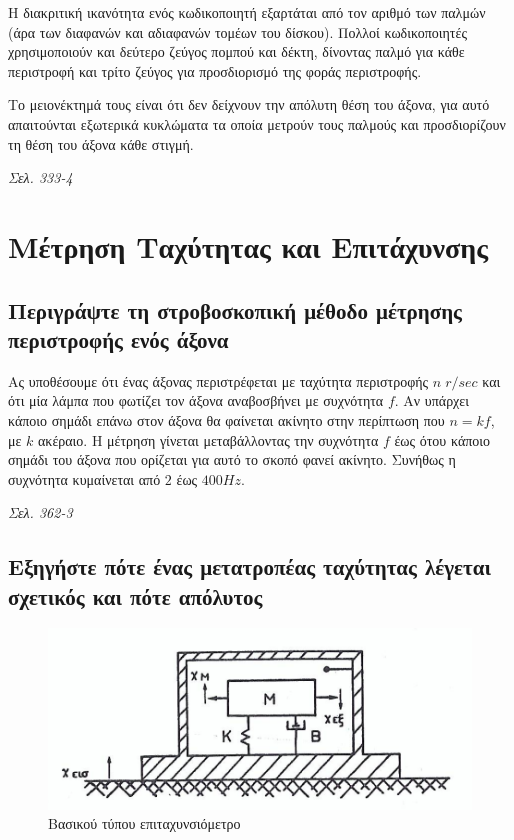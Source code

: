 \documentclass{article}
\begin{document}
Η διακριτική ικανότητα ενός κωδικοποιητή εξαρτάται από τον αριθμό των παλμών (άρα των διαφανών και αδιαφανών τομέων του δίσκου). Πολλοί κωδικοποιητές χρησιμοποιούν 
και δεύτερο ζεύγος πομπού και δέκτη, δίνοντας παλμό για κάθε περιστροφή και τρίτο ζεύγος για προσδιορισμό της φοράς περιστροφής. 

Το μειονέκτημά τους είναι ότι δεν δείχνουν την απόλυτη θέση του άξονα, για αυτό απαιτούνται εξωτερικά κυκλώματα τα οποία μετρούν τους παλμούς και προσδιορίζουν τη θέση του
άξονα κάθε στιγμή.

\emph{Σελ. 333-4}


\section{Μέτρηση Ταχύτητας και Επιτάχυνσης}
\subsection{Περιγράψτε τη στροβοσκοπική μέθοδο μέτρησης περιστροφής ενός άξονα}
Ας υποθέσουμε ότι ένας άξονας περιστρέφεται με ταχύτητα περιστροφής $n\;r/sec$ και ότι μία λάμπα που φωτίζει τον άξονα αναβοσβήνει με συχνότητα $f$. Αν υπάρχει κάποιο 
σημάδι επάνω στον άξονα θα φαίνεται ακίνητο στην περίπτωση που $n=kf$, με $k$ ακέραιο. Η μέτρηση γίνεται μεταβάλλοντας την συχνότητα $f$ έως ότου κάποιο σημάδι του άξονα
που ορίζεται για αυτό το σκοπό φανεί ακίνητο. Συνήθως η συχνότητα κυμαίνεται από $2$ έως $400 Ηz$.

\emph{Σελ. 362-3}

\subsection{Εξηγήστε πότε ένας μετατροπέας ταχύτητας λέγεται σχετικός και πότε απόλυτος}

\begin{figure}[h!]
    \includegraphics[width=\linewidth]{epitaxinsiometro.png}
    \caption{Βασικού τύπου επιταχυνσιόμετρο}
    \label{fig:5.1epitax}
\end{figure}
\end{document}
